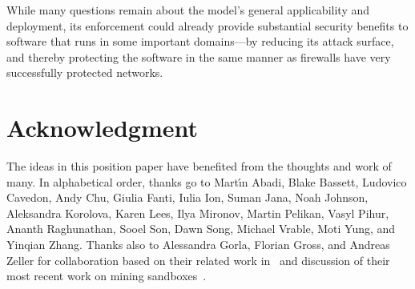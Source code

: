 \documentclass{IEEEtran}
\begin{document}
While many questions remain about the model's general applicability and deployment,
its enforcement could already provide substantial security benefits
to software that runs in some important domains---by reducing its attack surface,
and
thereby protecting the
software in the same manner as firewalls 
have very successfully protected networks.



\section*{Acknowledgment}
The ideas in this position paper have benefited from the thoughts and work of many.
In alphabetical order, thanks go to 
Mart{\'\i}n Abadi,
Blake Bassett,
Ludovico Cavedon,
Andy Chu, 
Giulia Fanti, 
Iulia Ion,
Suman Jana,
Noah Johnson, 
Aleksandra Korolova,
Karen Lees, 
Ilya Mironov, 
Martin Pelikan,
Vasyl Pihur, 
Ananth Raghunathan,
Sooel Son, 
Dawn Song,
Michael Vrable,
Moti Yung,
and
Yinqian Zhang.
Thanks also to Alessandra Gorla, Florian Gross, and Andreas Zeller
for collaboration based on their related work in~\cite{Chabada}
and discussion of their most recent work on mining sandboxes~\cite{MiningSandboxes}.



\end{document}
